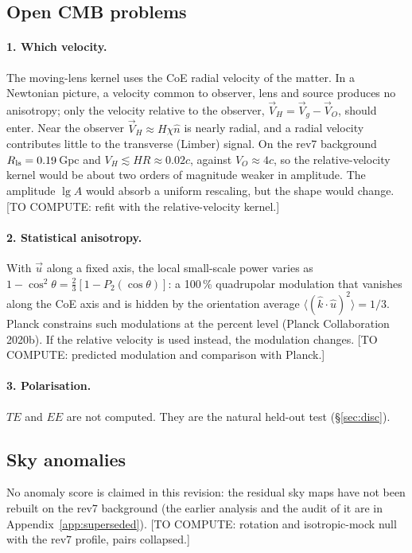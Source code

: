 \documentclass[11pt]{article}
\newcommand{\todo}[1]{\textsf{[#1]}}
\begin{document}
\subsection{Open CMB problems}\label{sec:open}
\paragraph{1. Which velocity.} The moving-lens kernel uses the CoE radial velocity of the matter. In a Newtonian picture, a velocity common to observer, lens and source produces no anisotropy; only the velocity relative to the observer, $\vec V_H=\vec V_g-\vec V_O$, should enter. Near the observer $\vec V_H\approx H\chi\hat n$ is nearly radial, and a radial velocity contributes little to the transverse (Limber) signal. On the rev7 background $R_{\rm ls}=0.19$\,Gpc and $V_H\lesssim HR\approx0.02c$, against $V_O\approx4c$, so the relative-velocity kernel would be about two orders of magnitude weaker in amplitude. The amplitude $\lg A$ would absorb a uniform rescaling, but the shape would change. \todo{TO COMPUTE: refit with the relative-velocity kernel.}
\paragraph{2. Statistical anisotropy.} With $\vec u$ along a fixed axis, the local small-scale power varies as $1-\cos^2\theta=\tfrac23[1-P_2(\cos\theta)]$: a 100\,\% quadrupolar modulation that vanishes along the CoE axis and is hidden by the orientation average $\langle(\hat k\cdot\hat u)^2\rangle=1/3$. Planck constrains such modulations at the percent level (Planck Collaboration 2020b). If the relative velocity is used instead, the modulation changes. \todo{TO COMPUTE: predicted modulation and comparison with Planck.}
\paragraph{3. Polarisation.} $TE$ and $EE$ are not computed. They are the natural held-out test (\S\ref{sec:disc}).

\subsection{Sky anomalies}\label{sec:anom}
No anomaly score is claimed in this revision: the residual sky maps have not been rebuilt on the rev7 background (the earlier analysis and the audit of it are in Appendix~\ref{app:superseded}). \todo{TO COMPUTE: rotation and isotropic-mock null with the rev7 profile, pairs collapsed.}
\end{document}

